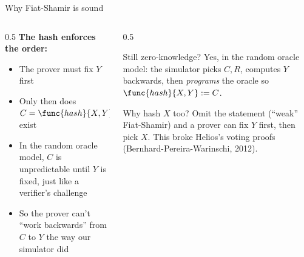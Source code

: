 \ifdefined\PRESENTATION\else\PassOptionsToClass{handout}{beamer}\fi\documentclass[aspectratio=169, lualatex]{beamer}
\begin{document}
\begin{frame}{Why Fiat-Shamir is sound}
	\begin{columns}[c]
		\begin{column}{0.5\textwidth}
			\textbf{The hash enforces the order:}
			\begin{itemize}
				\item The prover must fix $Y$ first
				\item Only then does $C = \func{hash}{X, Y}$ exist
				\item In the random oracle model, $C$ is unpredictable until $Y$ is fixed, just like a verifier's challenge
				\item So the prover can't ``work backwards'' from $C$ to $Y$ the way our simulator did
			\end{itemize}
		\end{column}
		\begin{column}{0.5\textwidth}
			\begin{alertblock}{Still zero-knowledge?}
				Yes, in the random oracle model: the simulator picks $C, R$, computes $Y$ backwards, then \textit{programs} the oracle so $\func{hash}{X, Y} := C$.
			\end{alertblock}
			\begin{exampleblock}{Why hash $X$ too?}
				Omit the statement (``weak'' Fiat-Shamir) and a prover can fix $Y$ first, then pick $X$. This broke Helios's voting proofs (Bernhard-Pereira-Warinschi, 2012).
			\end{exampleblock}
		\end{column}
	\end{columns}
\end{frame}
\end{document}
